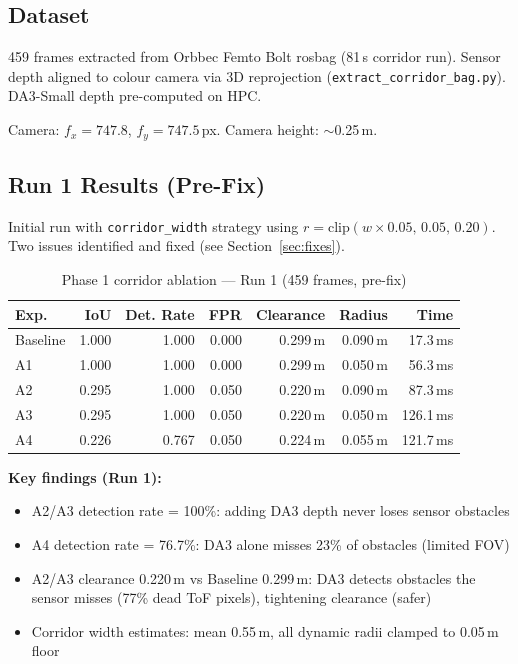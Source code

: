 \documentclass[11pt,a4paper]{article}
\begin{document}
\subsection{Dataset}

459 frames extracted from Orbbec Femto Bolt rosbag (81\,s corridor run).
Sensor depth aligned to colour camera via 3D reprojection
(\texttt{extract\_corridor\_bag.py}). DA3-Small depth pre-computed on HPC.

Camera: $f_x = 747.8$, $f_y = 747.5$\,px. Camera height: $\sim$0.25\,m.

\subsection{Run 1 Results (Pre-Fix)}

Initial run with \texttt{corridor\_width} strategy using
$r = \text{clip}(w \times 0.05,\, 0.05,\, 0.20)$. Two issues identified
and fixed (see Section~\ref{sec:fixes}).

\begin{table}[h]
\centering
\caption{Phase 1 corridor ablation --- Run 1 (459 frames, pre-fix)}
\label{tab:phase1-run1}
\begin{tabular}{lrrrrrr}
\toprule
\textbf{Exp.} & \textbf{IoU} & \textbf{Det. Rate} & \textbf{FPR} & \textbf{Clearance} & \textbf{Radius} & \textbf{Time} \\
\midrule
Baseline & 1.000 & 1.000 & 0.000 & 0.299\,m & 0.090\,m & 17.3\,ms \\
A1       & 1.000 & 1.000 & 0.000 & 0.299\,m & 0.050\,m & 56.3\,ms \\
A2       & 0.295 & 1.000 & 0.050 & 0.220\,m & 0.090\,m & 87.3\,ms \\
A3       & 0.295 & 1.000 & 0.050 & 0.220\,m & 0.050\,m & 126.1\,ms \\
A4       & 0.226 & 0.767 & 0.050 & 0.224\,m & 0.055\,m & 121.7\,ms \\
\bottomrule
\end{tabular}
\end{table}

\textbf{Key findings (Run 1):}
\begin{itemize}[nosep]
  \item A2/A3 detection rate = 100\%: adding DA3 depth never loses sensor obstacles
  \item A4 detection rate = 76.7\%: DA3 alone misses 23\% of obstacles (limited FOV)
  \item A2/A3 clearance 0.220\,m vs Baseline 0.299\,m: DA3 detects obstacles the
    sensor misses (77\% dead ToF pixels), tightening clearance (safer)
  \item Corridor width estimates: mean 0.55\,m, all dynamic radii clamped to 0.05\,m floor
\end{itemize}
\end{document}

